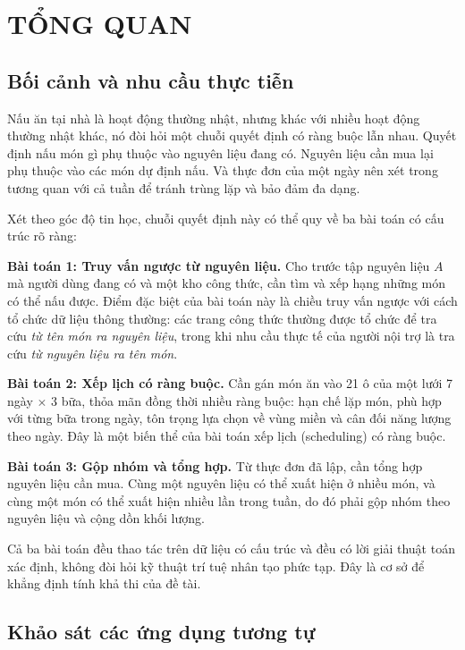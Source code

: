 \chapter{TỔNG QUAN}
\label{ch:tong-quan}

\section{Bối cảnh và nhu cầu thực tiễn}
\label{sec:boi-canh}

Nấu ăn tại nhà là hoạt động thường nhật, nhưng khác với nhiều hoạt động thường
nhật khác, nó đòi hỏi một chuỗi quyết định có ràng buộc lẫn nhau. Quyết định nấu
món gì phụ thuộc vào nguyên liệu đang có. Nguyên liệu cần mua lại phụ thuộc vào
các món dự định nấu. Và thực đơn của một ngày nên xét trong tương quan với cả
tuần để tránh trùng lặp và bảo đảm đa dạng.

Xét theo góc độ tin học, chuỗi quyết định này có thể quy về ba bài toán có cấu
trúc rõ ràng:

\textbf{Bài toán 1: Truy vấn ngược từ nguyên liệu.} Cho trước tập nguyên liệu
$A$ mà người dùng đang có và một kho công thức, cần tìm và xếp hạng những món có
thể nấu được. Điểm đặc biệt của bài toán này là chiều truy vấn ngược với cách tổ
chức dữ liệu thông thường: các trang công thức thường được tổ chức để tra cứu
\textit{từ tên món ra nguyên liệu}, trong khi nhu cầu thực tế của người nội trợ
là tra cứu \textit{từ nguyên liệu ra tên món}.

\textbf{Bài toán 2: Xếp lịch có ràng buộc.} Cần gán món ăn vào 21 ô của một lưới
7 ngày $\times$ 3 bữa, thỏa mãn đồng thời nhiều ràng buộc: hạn chế lặp món, phù
hợp với từng bữa trong ngày, tôn trọng lựa chọn về vùng miền và cân đối năng
lượng theo ngày. Đây là một biến thể của bài toán xếp lịch (scheduling) có ràng
buộc.

\textbf{Bài toán 3: Gộp nhóm và tổng hợp.} Từ thực đơn đã lập, cần tổng hợp
nguyên liệu cần mua. Cùng một nguyên liệu có thể xuất hiện ở nhiều món, và cùng
một món có thể xuất hiện nhiều lần trong tuần, do đó phải gộp nhóm theo nguyên
liệu và cộng dồn khối lượng.

Cả ba bài toán đều thao tác trên dữ liệu có cấu trúc và đều có lời giải thuật
toán xác định, không đòi hỏi kỹ thuật trí tuệ nhân tạo phức tạp. Đây là cơ sở để
khẳng định tính khả thi của đề tài.

\section{Khảo sát các ứng dụng tương tự}
\label{sec:khao-sat}


